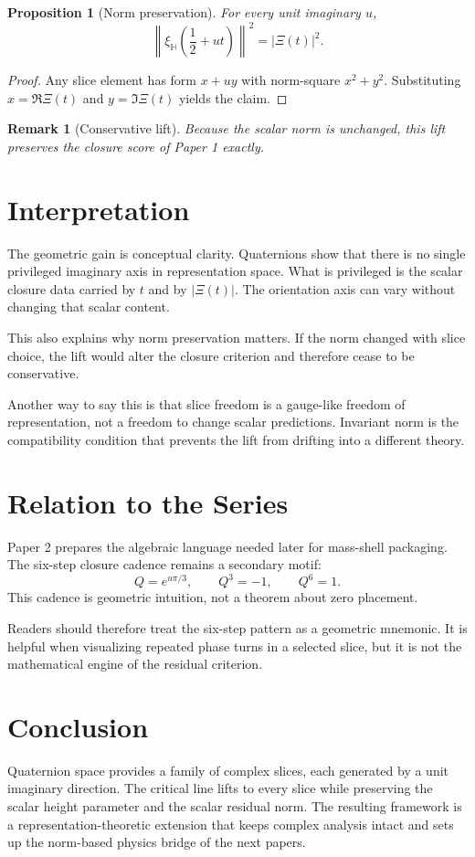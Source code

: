 \documentclass[11pt]{article}
\newtheorem{proposition}{Proposition}
\newtheorem{remark}{Remark}
\begin{document}
\begin{proposition}[Norm preservation]
For every unit imaginary $u$,
\[
\left\|\xi_{\mathbb H}\!\left(\frac12+ut\right)\right\|^2=|\Xi(t)|^2.
\]
\end{proposition}

\begin{proof}
Any slice element has form $x+uy$ with norm-square $x^2+y^2$. Substituting $x=\Re\Xi(t)$ and $y=\Im\Xi(t)$ yields the claim.
\end{proof}

\begin{remark}[Conservative lift]
Because the scalar norm is unchanged, this lift preserves the closure score of Paper 1 exactly.
\end{remark}

\section{Interpretation}
The geometric gain is conceptual clarity. Quaternions show that there is no single privileged imaginary axis in representation space. What is privileged is the scalar closure data carried by $t$ and by $|\Xi(t)|$. The orientation axis can vary without changing that scalar content.

This also explains why norm preservation matters. If the norm changed with slice choice, the lift would alter the closure criterion and therefore cease to be conservative.

Another way to say this is that slice freedom is a gauge-like freedom of representation, not a freedom to change scalar predictions. Invariant norm is the compatibility condition that prevents the lift from drifting into a different theory.

\section{Relation to the Series}
Paper 2 prepares the algebraic language needed later for mass-shell packaging. The six-step closure cadence remains a secondary motif:
\[
Q=e^{u\pi/3},\qquad Q^3=-1,\qquad Q^6=1.
\]
This cadence is geometric intuition, not a theorem about zero placement.

Readers should therefore treat the six-step pattern as a geometric mnemonic. It is helpful when visualizing repeated phase turns in a selected slice, but it is not the mathematical engine of the residual criterion.

\section{Conclusion}
Quaternion space provides a family of complex slices, each generated by a unit imaginary direction. The critical line lifts to every slice while preserving the scalar height parameter and the scalar residual norm. The resulting framework is a representation-theoretic extension that keeps complex analysis intact and sets up the norm-based physics bridge of the next papers.
\end{document}
